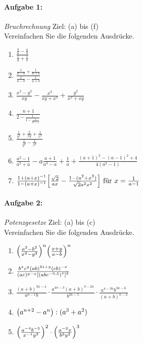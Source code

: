
\paragraph{Aufgabe 1: } \emph{Bruchrechnung} \hfill Ziel: (a) bis (f)\\[0.2cm]
Vereinfachen Sie die folgenden Ausdrücke.

\begin{enumerate}[label=(\alph*)]
    \item $\frac{\frac{b}{a}-\frac{a}{b}}{\frac{1}{a}+\frac{1}{b}}$
    \item $\frac{\frac{1}{a-b}+\frac{1}{a+b}}{\frac{1}{a-b}-\frac{1}{a+b}}$
    \item $\frac{x^2-y^2}{xy}-\frac{x^2}{xy+x^2}+\frac{y^2}{x^2+xy}$
    \item $\frac{n+1}{2-\frac{1}{1-\frac{1}{n^2+1}}}$
    \item $\frac{\frac{1}{y^2}+\frac{2}{xy}+\frac{1}{x^2}}{\frac{1}{y^2}-\frac{1}{x^2}}$
    \item $\frac{a^2-1}{a^2+a}-a\frac{a+1}{a^3-a}+\frac{1}{a}+\frac{(a+1)^2-(a-1)^2+4}{4(a^2-1)}$
    \item $\frac{1+(a+x)^{-1}}{1-(a+x)^{-1}}\qty[\frac{\sqrt{2}}{ax}-\frac{1-(a^2+x^2)}{\sqrt{2}a^2x^2}] \text{ für } x=\frac{1}{a-1}$
\end{enumerate}

\paragraph{Aufgabe 2: } \emph{Potenzgesetze} \hfill Ziel: (a) bis (c)\\[0.2cm]
Vereinfachen Sie die folgenden Ausdrücke.

\begin{enumerate}[label=(\alph*)]
    \item $\qty(\frac{a^2-b^2}{x^2-y^2})^n\qty(\frac{x+y}{a-b})^n$
    \item $\frac{b^xc^y(ab)^{2z+y}(cb)^{-x}}{(ac)^{y-x}\qty[\qty(abc^{-0,5})^z]^2}$
    \item $\frac{(a+b)^{3n-4}}{a^{n-1}b}\cdot\frac{a^{4n-3}(a+b)^{3-2n}}{b^{2n-5}}\cdot\frac{a^{4-3n}b^{3n-6}}{(a+b)^{n-2}}$
    \item $\qty(a^{n+2}-a^n):(a^3+a^2)$
    \item $\qty(\frac{a^{-4}b^{-5}}{x^{-1}y^3})^2\cdot\qty(\frac{a^{-2}x}{b^3y^2})^3$
\end{enumerate}
%
